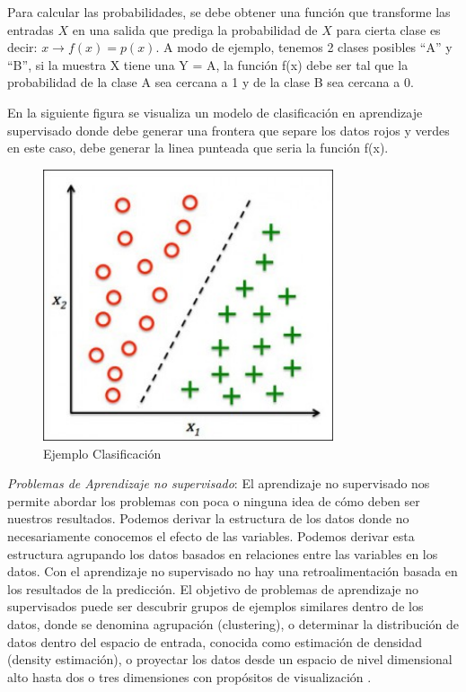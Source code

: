 Para calcular las probabilidades, se debe obtener una función que transforme las entradas $X$ en una salida que prediga la probabilidad de $X$ para cierta clase es decir: $ x \longrightarrow f(x) = p(x) $. A modo de ejemplo,  tenemos 2 clases posibles “A” y “B”, si la muestra X tiene una Y = A, la función f(x) debe ser tal que la probabilidad de la clase A sea cercana a 1 y  de la clase B sea cercana a 0.

En la siguiente figura se visualiza un modelo de clasificación en aprendizaje supervisado donde debe generar una frontera que separe los datos rojos y verdes en este caso, debe generar la linea punteada que seria la función f(x).

\begin{figure}[H] \centering
  \includegraphics[height=8cm,keepaspectratio=true,clip=true]{imagenes/MarcoTeorico/classification.jpg}
  \caption{Ejemplo Clasificación}\label{Fig:clasificacion}
\end{figure}


\textit{Problemas de Aprendizaje no supervisado}: El aprendizaje no supervisado nos permite abordar los problemas con
poca o ninguna idea de cómo deben ser nuestros resultados. Podemos derivar la estructura de los datos donde no necesariamente conocemos el efecto de las variables. Podemos derivar esta estructura agrupando los datos basados en relaciones entre las variables en los datos. Con el aprendizaje no supervisado no hay una retroalimentación basada en los resultados de la predicción. El objetivo de problemas de aprendizaje no supervisados puede ser descubrir grupos de ejemplos similares dentro de los datos, donde se denomina agrupación (clustering), o determinar la distribución de datos dentro del espacio de entrada, conocida como estimación de densidad (density estimación), o proyectar los datos desde un espacio de nivel dimensional alto hasta dos o tres dimensiones con propósitos de visualización \citep{bishop}.

